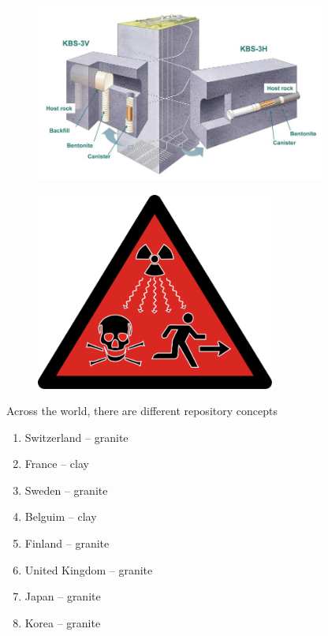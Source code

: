 \documentclass[aspectratio=1610,pdftex,dvipsnames,compress,xcolor={dvipsnames}]{beamer}
\begin{document}
\begin{frame}{}
    \begin{figure}
        \centering
        \includegraphics[width=0.85\textwidth]{kbs.jpg}
    \end{figure}
\end{frame}


\begin{frame}{}
    \begin{figure}
        \centering
        \includegraphics[width=0.70\textwidth]{repository.jpg}
    \end{figure}
\end{frame}


\begin{frame}{Across the world, there are different repository concepts}
    \begin{enumerate}[series=outerlist,topsep=0pt,itemsep=18pt,leftmargin=*,label=(\arabic*)]
        \item[]Switzerland -- granite
        \item[]France -- clay
        \item[]Sweden -- granite
        \item[]Belguim -- clay
        \item[]Finland -- granite 
        \item[]United Kingdom -- granite
        \item[]Japan -- granite
        \item[]Korea -- granite
    \end{enumerate}
\end{frame}
\end{document}
